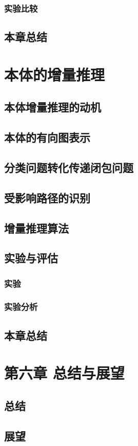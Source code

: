 \subsection{实验比较}
\section{本章总结}

\chapter{本体的增量推理}
\section{本体增量推理的动机}
\section{本体的有向图表示}
\section{分类问题转化传递闭包问题}
\section{受影响路径的识别}
\section{增量推理算法}
\section{实验与评估}
\subsection{实验}
\subsection{实验分析}
\section{本章总结}

\chapter{第六章 总结与展望}
\section{总结}
\section{展望}




